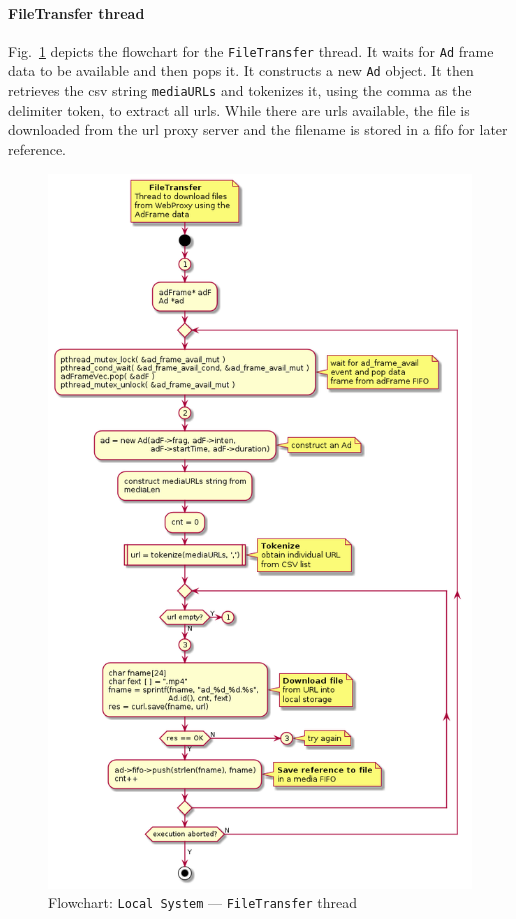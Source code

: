 \paragraph{FileTransfer thread}
Fig.~\ref{fig:flow-local-file-transfer} depicts the flowchart for the
\texttt{FileTransfer} thread. It waits for \texttt{Ad} frame data to be
available and then pops it. It constructs a new \texttt{Ad} object. It then
retrieves the \gls{csv} string \texttt{mediaURLs} and tokenizes it, using the
comma as the delimiter token, to extract all \glspl{url}. While there are
\glspl{url} available, the file is downloaded from the \gls{url} proxy server
and the filename is stored in a \gls{fifo} for later reference.
%
\begin{figure}[htb!]
\centering
    \includegraphics[width=0.6\columnwidth]{./img/flow-local-file-transfer.png}
  \caption{Flowchart: \texttt{Local System} --- \texttt{FileTransfer} thread}%
\label{fig:flow-local-file-transfer}
\end{figure}
%
